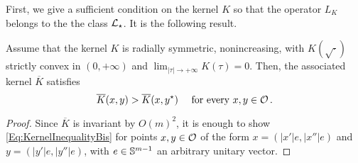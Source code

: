 First, we give a sufficient condition on the kernel $K$ so that the operator $L_K$ belongs to the the class $\mathcal{L}_\star$. It is the following result.

\begin{proposition}
\label{Prop:KernelInequalitySufficientCondition} 
Assume that the kernel $K$ is radially symmetric, nonincreasing, with $K(\sqrt{\cdot})$ strictly convex in $(0,+\infty)$ and $\lim_{|\tau|\to+\infty} K(\tau) = 0$. Then, the associated kernel $\overline{K}$ satisfies
	\begin{equation}
	\label{Eq:KernelInequalityBis}
	\overline{K}(x,y) > \overline{K}(x, y^\star) \quad \text{ for every }x,y \in \mathcal{O}\,.
	\end{equation}
\end{proposition}

\begin{proof}
Since $\overline{K}$ is invariant by $O(m)^2$, it is enough to show \eqref{Eq:KernelInequalityBis} for points $x, y\in \mathcal{O}$ of the form $x = (|x'|e, |x''|e)$ and $y = (|y'|e, |y''|e)$, with $e \in \mathbb{S}^{m-1}$ an arbitrary unitary vector.



\end{proof}
